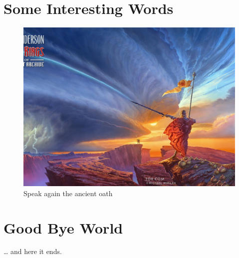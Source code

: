 \documentclass[a4paper,11pt]{article}
\author{Theo.h}\title
\begin{document}
\maketitle
\tableofcontents
\section{Some Interesting Words}
\begin{figure}[htbp]
\centerline{\includegraphics[scale=.2]{way-kings-stormlight-archive-brandon-sanderson-cover.jpg}}
\caption{Speak again the ancient oath}
\label{fig}
\end{figure}


\section{Good Bye World}
\ldots{} and here it ends.
\end{document}
